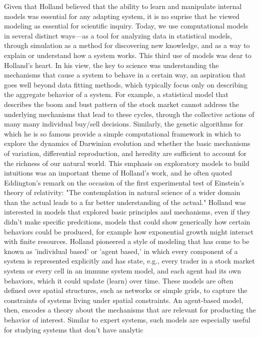 \documentclass{sig-alternate}
\begin{document}
Given that Holland believed that the ability to learn and manipulate
internal models was essential for any adapting system, it is no
suprise that he viewed modeling as essential for scientific inquiry.
Today, we use computational models in several distinct ways---as a
tool for analyzing data in statistical models, through simulation as a
method for discovering new knowledge, and as a way to explain or
understand how a system works.  This third use of models was dear to
Holland's heart.  In his view, the key to science was understanding
the mechanisms that cause a system to behave in a certain way, an
aspiration that goes well beyond data fitting methods, which typically
focus only on describing the aggregate behavior of a system.  For
example, a statistical model that describes the boom and bust pattern
of the stock market cannot address the underlying mechanisms that lead
to these cycles, through the collective actions of many many
individual buy/sell decisions.  Similarly, the genetic algorithms for
which he is so famous provide a simple computational framework in
which to explore the dynamics of Darwinian evolution and whether the
basic mechanisms of variation, differential reproduction, and heredity
are sufficient to account for the richness of our natural world.  This
emphasis on exploratory models to build intuitions was an important
theme of Holland's work, and he often quoted Eddington's remark on the
occasion of the first experimental test of Einstein's theory of
relativity: "The contemplation in natural science of a wider domain
than the actual leads to a far better understanding of the actual."
Holland was interested in models that explored basic principles and
mechanisms, even if they didn't make specific predcitions, models that
could show generically how certain behaviors could be produced, for
example how exponential growth might interact with finite resources.
Holland pioneered a style of modeling that has come to be known as
'individual based' or 'agent based,' in which every component of a
system is represented explicitly and has state, e.g., every trader in
a stock market system or every cell in an immune system model, and
each agent had its own behaviors, which it could update (learn) over
time.  These models are often defined over spatial structures, such as
networks or simple grids, to capture the constraints of systems living
under spatial constraints.  An agent-based model, then, encodes a
theory about the mechanisms that are relevant for producting the
behavior of interest.  Similar to expert systems, such models are
especially useful for studying systems that don't have analytic
\end{document}
